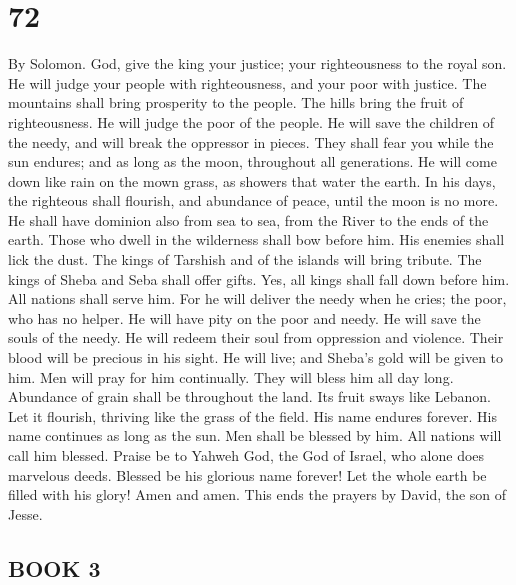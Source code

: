 \hypertarget{section-69}{%
\section{72}\label{section-69}}

By Solomon.  God, give the king your justice; your
righteousness to the royal son.  He will judge your people
with righteousness, and your poor with justice.  The
mountains shall bring prosperity to the people. The hills bring the
fruit of righteousness.  He will judge the poor of the
people. He will save the children of the needy, and will break the
oppressor in pieces.  They shall fear you while the sun
endures; and as long as the moon, throughout all generations.
 He will come down like rain on the mown grass, as showers
that water the earth.  In his days, the righteous shall
flourish, and abundance of peace, until the moon is no more.
 He shall have dominion also from sea to sea, from the River
to the ends of the earth.  Those who dwell in the wilderness
shall bow before him. His enemies shall lick the dust.  The
kings of Tarshish and of the islands will bring tribute. The kings of
Sheba and Seba shall offer gifts.  Yes, all kings shall
fall down before him. All nations shall serve him.  For he
will deliver the needy when he cries; the poor, who has no helper.
 He will have pity on the poor and needy. He will save the
souls of the needy.  He will redeem their soul from
oppression and violence. Their blood will be precious in his sight.
 He will live; and Sheba's gold will be given to him. Men
will pray for him continually. They will bless him all day long.
 Abundance of grain shall be throughout the land. Its fruit
sways like Lebanon. Let it flourish, thriving like the grass of the
field.  His name endures forever. His name continues as
long as the sun. Men shall be blessed by him. All nations will call him
blessed.  Praise be to Yahweh God, the God of Israel, who
alone does marvelous deeds.  Blessed be his glorious name
forever! Let the whole earth be filled with his glory! Amen and amen.
 This ends the prayers by David, the son of Jesse.

\hypertarget{book-3}{%
\subsection{BOOK 3}\label{book-3}}


